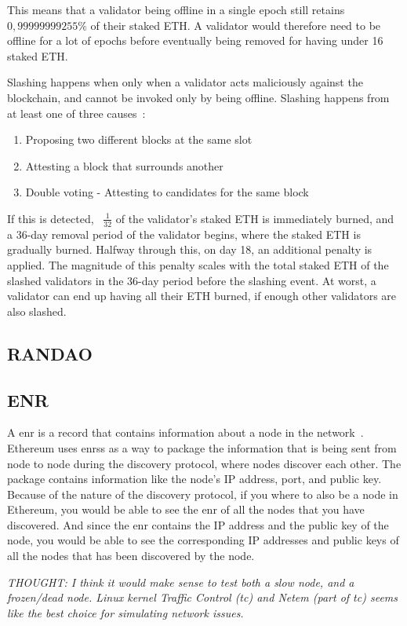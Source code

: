 This means that a validator being offline in a single epoch still retains $0,99999999255\%$ of their staked ETH\@.
A validator would therefore need to be offline for a lot of epochs before eventually being removed for having under 16 staked ETH\@.


Slashing happens when only when a validator acts maliciously against the blockchain, and cannot be invoked only by being offline.
Slashing happens from at least one of three causes~\cite{PoSRewAndPen}:
\begin{enumerate}
    \item Proposing two different blocks at the same slot
    \item Attesting a block that surrounds another
    \item Double voting - Attesting to candidates for the same block
\end{enumerate}
If this is detected, ~$\frac{1}{32}$ of the validator's staked ETH is immediately burned, and a 36-day removal period of the validator begins, where the staked ETH is gradually burned.
Halfway through this, on day 18, an additional penalty is applied.
The magnitude of this penalty scales with the total staked ETH of the slashed validators in the 36-day period before the slashing event.
At worst, a validator can end up having all their ETH burned, if enough other validators are also slashed.

\subsection{RANDAO}\label{subsec:randao}

\subsection{ENR}\label{subsec:enr}
A \gls{enr} is a record that contains information about a node in the network~\cite{EIP-778:Ethereum-Node-Records}.
Ethereum uses \glspl{enr}s as a way
to package the information that is being sent from node to node during the discovery protocol,
where nodes discover each other.
The package contains information like the node's IP address, port, and public key.
Because of the nature of the discovery protocol, if you where to also be a node in Ethereum,
you would be able to see the \gls{enr} of all the nodes that you have discovered.
And since the \gls{enr} contains the IP address and the public key of the node,
you would be able
to see the corresponding IP addresses and public keys of all the nodes that has been discovered by the node.



\textit{THOUGHT: I think it would make sense to test both a slow node, and a frozen/dead node.
Linux kernel Traffic Control (tc) and Netem (part of tc) seems like the best choice for simulating network issues.}
